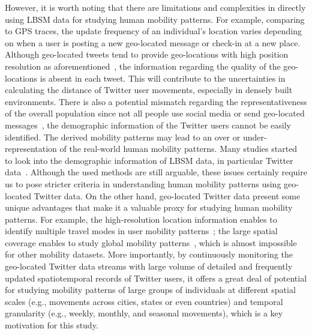 \documentclass[ijgi,article,accept,moreauthors,pdftex,10pt,a4paper]{mdpi}
\theoremstyle{mdpi}
\newcounter{ex}
\newcounter{re}
\theoremstyle{mdpidefinition}
\begin{document}
However, it is worth noting that there are limitations and complexities in directly using LBSM data for studying human mobility patterns.
For example, comparing to GPS traces, the update frequency of an individual's location varies depending on when a user is posting a new geo-located message or check-in at a new place.
Although geo-located tweets tend to provide geo-locations with high position resolution as aforementioned~\cite{Jurdak2015}, the information regarding the quality of the geo-locations is absent in each tweet.
This will contribute to the uncertainties in calculating the distance of Twitter user movements, especially in densely built environments.   
There is also a potential mismatch regarding the representativeness of the overall population since not all people use social media or send geo-located messages~\cite{kung2014exploring}, the demographic information of the Twitter users cannot be easily identified.
The derived mobility patterns may lead to an over or under-representation of the real-world human mobility patterns.
Many studies started to look into the demographic information of LBSM data, in particular Twitter data~\cite{mitchell2013geography,longley2015geotemporal}.
Although the used methods are still arguable, these issues certainly require us to pose stricter criteria in understanding human mobility patterns using geo-located Twitter data.
On the other hand, geo-located Twitter data present some unique advantages that make it a valuable proxy for studying human mobility patterns.
For example, the high-resolution location information enables to identify multiple travel modes in user mobility patterns~\cite{Jurdak2015}; the large spatial coverage enables to study global mobility patterns~\cite{hawelka2014geo}, which is almost impossible for other mobility datasets.
More importantly, by continuously monitoring the geo-located Twitter data streams with large volume of detailed and frequently updated spatiotemporal records of Twitter users, it offers a great deal of potential for studying mobility patterns of large groups of individuals at different spatial scales (e.g., movements across cities, states or even countries) and temporal granularity (e.g., weekly, monthly, and seasonal movements), which is a key motivation for this study.
\end{document}
